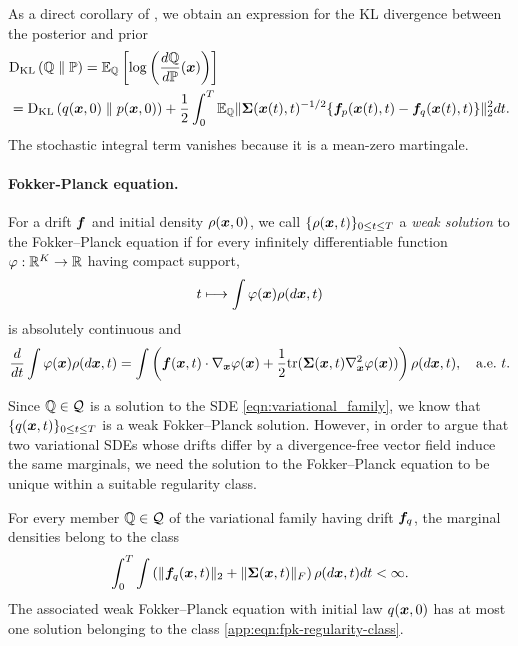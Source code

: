 As a direct corollary of , we obtain an expression for the KL divergence between the posterior and prior
{\small
\begin{align}
    &\textrm{D}_{\textrm{KL}}\left(\mathbb{Q}\;\|\;\mathbb{P}\right) = \mathbb{E}_{\mathbb{Q}}\left[\log\left(\frac{d\mathbb{Q}}{d\mathbb{P}}(\boldsymbol{x})\right)\right]\nonumber\\
    &= \textrm{D}_{\textrm{KL}}\left(q(\boldsymbol{x}, 0)\;\|\;p(\boldsymbol{x}, 0)\right) + \frac{1}{2} \int_0^{T} \mathbb{E}_{\mathbb{Q}}\| \boldsymbol{\Sigma}(\boldsymbol{x}(t), t)^{-1/2}\{\boldsymbol{f}_p(\boldsymbol{x}(t),t) -  \boldsymbol{f}_q(\boldsymbol{x}(t), t)\}\|_2^2 dt. \label{app:eqn:path-kl}
\end{align}
}
The stochastic integral term vanishes because it is a mean-zero martingale.

\paragraph{Fokker-Planck equation.}
For a drift $\boldsymbol{f}$ and initial density $\rho(\boldsymbol{x},0)$, we call $\{\rho(\boldsymbol{x},t)\}_{0\leq t\leq T}$ a \emph{weak solution} to the Fokker--Planck equation if for every infinitely differentiable function $\varphi: \mathbb{R}^K \to \mathbb{R}$  having compact support,
\begin{equation*}
    t \longmapsto \int \varphi(\boldsymbol{x})\rho(d\boldsymbol{x}, t)
\end{equation*}
is absolutely continuous and 
\begin{equation}\label{app:eqn:fpk-weak}
    \frac{d}{dt} \int \varphi(\boldsymbol{x}) \rho(d\boldsymbol{x}, t) = \int\left( \boldsymbol{f}(\boldsymbol{x}, t) \cdot \nabla_{\boldsymbol{x}} \varphi(\boldsymbol{x}) + \frac{1}{2} \mathrm{tr}(\boldsymbol{\Sigma}(\boldsymbol{x}, t) \nabla_{\boldsymbol{x}}^2 \varphi(\boldsymbol{x})) \right) \rho(d\boldsymbol{x}, t), \quad \text{a.e.~$t$}.
    \end{equation}

Since $\mathbb{Q} \in \mathcal{Q}$ is a solution to the SDE \cref{eqn:variational_family},  we know that $\{q(\boldsymbol{x}, t)\}_{0 \leq t \leq T}$ is a weak Fokker--Planck solution.
However, in order to argue that two variational SDEs whose drifts differ by a divergence-free vector field induce the same marginals, we need the solution to the Fokker--Planck equation to be unique within a suitable regularity class.
    
\begin{assumption}\label{app:ass:fpk-unique}
For every member $\mathbb{Q} \in \mathcal{Q}$ of the variational family having drift $\boldsymbol{f}_q$, the marginal densities belong to the class
\begin{equation}\label{app:eqn:fpk-regularity-class}
        \int_0^T\int \left( \|\boldsymbol{f}_q(\boldsymbol{x},t)\|_2 + \|\boldsymbol{\Sigma}(\boldsymbol{x},t)\|_F \right) \rho(d\boldsymbol{x},t) dt <\infty.
\end{equation}
The associated weak Fokker--Planck equation with initial law $q(\boldsymbol{x}, 0)$ has at most one solution belonging to the class \cref{app:eqn:fpk-regularity-class}.
\end{assumption}
    

